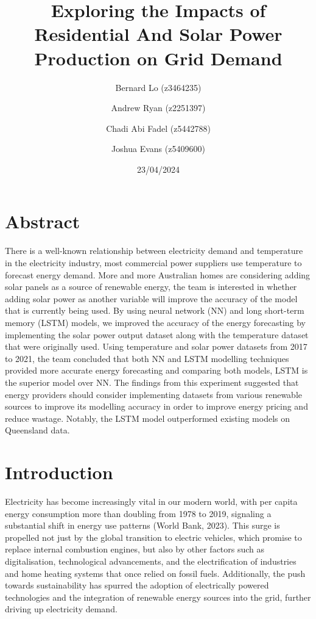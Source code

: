\documentclass[
]{article}
\title{Exploring the Impacts of Residential And Solar Power Production
on Grid Demand}
\author{Bernard Lo (z3464235) \and Andrew Ryan (z2251397) \and Chadi Abi
Fadel (z5442788) \and Joshua Evans (z5409600)}
\date{23/04/2024}
\begin{document}
\maketitle

{
\setcounter{tocdepth}{2}
\tableofcontents
}
\section{Abstract}\label{abstract}

There is a well-known relationship between electricity demand and
temperature in the electricity industry, most commercial power suppliers
use temperature to forecast energy demand. More and more Australian
homes are considering adding solar panels as a source of renewable
energy, the team is interested in whether adding solar power as another
variable will improve the accuracy of the model that is currently being
used. By using neural network (NN) and long short-term memory (LSTM)
models, we improved the accuracy of the energy forecasting by
implementing the solar power output dataset along with the temperature
dataset that were originally used. Using temperature and solar power
datasets from 2017 to 2021, the team concluded that both NN and LSTM
modelling techniques provided more accurate energy forecasting and
comparing both models, LSTM is the superior model over NN. The findings
from this experiment suggested that energy providers should consider
implementing datasets from various renewable sources to improve its
modelling accuracy in order to improve energy pricing and reduce
wastage. Notably, the LSTM model outperformed existing models on
Queensland data.

\section{Introduction}\label{introduction}

Electricity has become increasingly vital in our modern world, with per
capita energy consumption more than doubling from 1978 to 2019,
signaling a substantial shift in energy use patterns (World Bank, 2023).
This surge is propelled not just by the global transition to electric
vehicles, which promise to replace internal combustion engines, but also
by other factors such as digitalisation, technological advancements, and
the electrification of industries and home heating systems that once
relied on fossil fuels. Additionally, the push towards sustainability
has spurred the adoption of electrically powered technologies and the
integration of renewable energy sources into the grid, further driving
up electricity demand.
\end{document}
